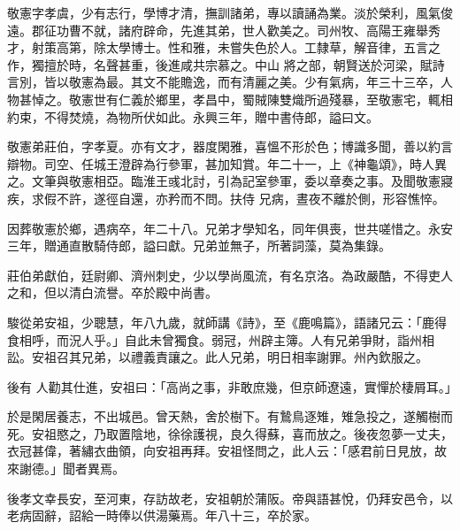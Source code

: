 \begin{pinyinscope}
 敬憲字孝虞，少有志行，學博才清，撫訓諸弟，專以讀誦為業。淡於榮利，風氣俊遠。郡征功曹不就，諸府辟命，先進其弟，世人歡美之。司州牧、高陽王雍舉秀才，射策高第，除太學博士。性和雅，未嘗失色於人。工隸草，解音律，五言之作，獨擅於時，名聲甚重，後進咸共宗慕之。中山
 將之部，朝賢送於河梁，賦詩言別，皆以敬憲為最。其文不能贍逸，而有清麗之美。少有氣病，年三十三卒，人物甚悼之。敬憲世有仁義於鄉里，孝昌中，蜀賊陳雙熾所過殘暴，至敬憲宅，輒相約束，不得焚燒，為物所伏如此。永興三年，贈中書侍郎，謚曰文。



 敬憲弟莊伯，字孝夏。亦有文才，器度閑雅，喜慍不形於色；博識多聞，善以約言辯物。司空、任城王澄辟為行參軍，甚加知賞。年二十一，上《神龜頌》，時人異之。文筆與敬憲相亞。臨淮王彧北討，引為記室參軍，委以章奏之事。及聞敬憲寢疾，求假不許，遂徑自還，亦矜而不問。扶侍
 兄病，晝夜不離於側，形容憔悴。



 因葬敬憲於鄉，遇病卒，年二十八。兄弟才學知名，同年俱喪，世共嗟惜之。永安三年，贈通直散騎侍郎，謚曰獻。兄弟並無子，所著詞藻，莫為集錄。



 莊伯弟獻伯，廷尉卿、濟州刺史，少以學尚風流，有名京洛。為政嚴酷，不得吏人之和，但以清白流譽。卒於殿中尚書。



 駿從弟安祖，少聰慧，年八九歲，就師講《詩》，至《鹿鳴篇》，語諸兄云：「鹿得食相呼，而況人乎。」自此未曾獨食。弱冠，州辟主簿。人有兄弟爭財，詣州相訟。安祖召其兄弟，以禮義責讓之。此人兄弟，明日相率謝罪。州內欽服之。



 後有
 人勸其仕進，安祖曰：「高尚之事，非敢庶幾，但京師遼遠，實憚於棲屑耳。」



 於是閑居養志，不出城邑。曾天熱，舍於樹下。有鷙鳥逐雉，雉急投之，遂觸樹而死。安祖愍之，乃取置陰地，徐徐護視，良久得蘇，喜而放之。後夜忽夢一丈夫，衣冠甚偉，著繡衣曲領，向安祖再拜。安祖怪問之，此人云：「感君前日見放，故來謝德。」聞者異焉。



 後孝文幸長安，至河東，存訪故老，安祖朝於蒲阪。帝與語甚悅，仍拜安邑令，以老病固辭，詔給一時俸以供湯藥焉。年八十三，卒於家。




\end{pinyinscope}
